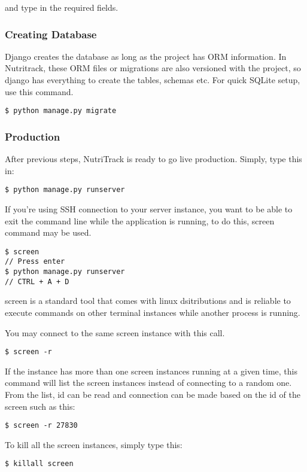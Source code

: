 and type in the required fields.

\subsubsection{Creating Database}
Django creates the database as long as the project has ORM information.
In Nutritrack, these ORM files or migrations are also versioned with the project,
so django has everything to create the tables, schemas etc. For quick SQLite setup,
use this command.

\begin{lstlisting}
$ python manage.py migrate
\end{lstlisting}

\subsubsection{Production}

After previous steps, NutriTrack is ready to go live production. Simply, type 
this in:

\begin{lstlisting}
$ python manage.py runserver 
\end{lstlisting}

If you're using SSH connection to your server instance, you want to be able
to exit the command line while the application is running, to do this, 
screen command may be used.

\begin{lstlisting}
$ screen
// Press enter
$ python manage.py runserver
// CTRL + A + D
\end{lstlisting}

screen is a standard tool that comes with linux dsitributions and is reliable
to execute commands on other terminal instances while another process is running.

You may connect to the same screen instance with this call.
\begin{lstlisting}
$ screen -r
\end{lstlisting}

If the instance has more than one screen instances running at a given time, 
this command will list the screen instances instead of connecting to 
a random one. From the list, id can be read and connection can be made based 
on the id of the screen such as this:

\begin{lstlisting}
$ screen -r 27830
\end{lstlisting}

To kill all the screen instances, simply type this:

\begin{lstlisting}
$ killall screen
\end{lstlisting}










